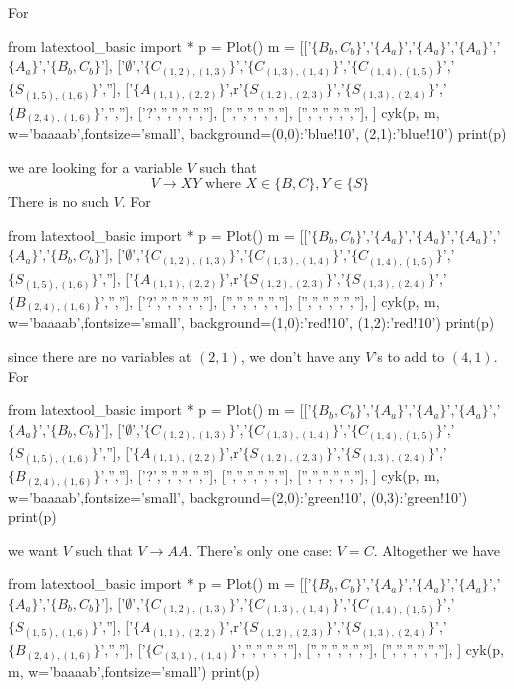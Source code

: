 For
\begin{python}
from latextool_basic import *
p = Plot()
m = [['$\{B_b,C_b\}$','$\{A_a\}$','$\{A_a\}$','$\{A_a\}$','$\{A_a\}$','$\{B_b,C_b\}$'],
     ['$\emptyset$','$\{C_{(1,2),(1,3)}\}$','$\{C_{(1,3),(1,4)}\}$','$\{C_{(1,4),(1,5)}\}$','$\{S_{(1,5),(1,6)}\}$',''],
     ['$\{A_{(1,1),(2,2)}\}$',r'$\{S_{(1,2),(2,3)}\}$','$\{S_{(1,3),(2,4)}\}$','$\{B_{(2,4),(1,6)}\}$','',''],
     ['?','','','','',''],
     ['','','','','',''],
     ['','','','','',''],
     ]
cyk(p, m, w='baaaab',fontsize='small', background={(0,0):'blue!10', (2,1):'blue!10'})
print(p)
\end{python}
we are looking for a variable $V$ such that
\[
  V \rightarrow XY \text{ where } X \in \{B,C\}, Y \in \{S\}
\]
There is no such $V$.
For
\begin{python}
from latextool_basic import *
p = Plot()
m = [['$\{B_b,C_b\}$','$\{A_a\}$','$\{A_a\}$','$\{A_a\}$','$\{A_a\}$','$\{B_b,C_b\}$'],
     ['$\emptyset$','$\{C_{(1,2),(1,3)}\}$','$\{C_{(1,3),(1,4)}\}$','$\{C_{(1,4),(1,5)}\}$','$\{S_{(1,5),(1,6)}\}$',''],
     ['$\{A_{(1,1),(2,2)}\}$',r'$\{S_{(1,2),(2,3)}\}$','$\{S_{(1,3),(2,4)}\}$','$\{B_{(2,4),(1,6)}\}$','',''],
     ['?','','','','',''],
     ['','','','','',''],
     ['','','','','',''],
     ]
cyk(p, m, w='baaaab',fontsize='small', background={(1,0):'red!10', (1,2):'red!10'})
print(p)
\end{python}
since there are no variables at $(2, 1)$, we don't have any $V$'s to add to $(4,1)$.
For
\begin{python}
from latextool_basic import *
p = Plot()
m = [['$\{B_b,C_b\}$','$\{A_a\}$','$\{A_a\}$','$\{A_a\}$','$\{A_a\}$','$\{B_b,C_b\}$'],
     ['$\emptyset$','$\{C_{(1,2),(1,3)}\}$','$\{C_{(1,3),(1,4)}\}$','$\{C_{(1,4),(1,5)}\}$','$\{S_{(1,5),(1,6)}\}$',''],
     ['$\{A_{(1,1),(2,2)}\}$',r'$\{S_{(1,2),(2,3)}\}$','$\{S_{(1,3),(2,4)}\}$','$\{B_{(2,4),(1,6)}\}$','',''],
     ['?','','','','',''],
     ['','','','','',''],
     ['','','','','',''],
     ]
cyk(p, m, w='baaaab',fontsize='small', background={(2,0):'green!10', (0,3):'green!10'})
print(p)
\end{python}
we want $V$ such that $V \rightarrow AA$. There's only one case: $V = C$.
Altogether we have
\begin{python}
from latextool_basic import *
p = Plot()
m = [['$\{B_b,C_b\}$','$\{A_a\}$','$\{A_a\}$','$\{A_a\}$','$\{A_a\}$','$\{B_b,C_b\}$'],
     ['$\emptyset$','$\{C_{(1,2),(1,3)}\}$','$\{C_{(1,3),(1,4)}\}$','$\{C_{(1,4),(1,5)}\}$','$\{S_{(1,5),(1,6)}\}$',''],
     ['$\{A_{(1,1),(2,2)}\}$',r'$\{S_{(1,2),(2,3)}\}$','$\{S_{(1,3),(2,4)}\}$','$\{B_{(2,4),(1,6)}\}$','',''],
     ['$\{C_{(3,1),(1,4)}\}$','','','','',''],
     ['','','','','',''],
     ['','','','','',''],
     ]
cyk(p, m, w='baaaab',fontsize='small')
print(p)
\end{python}


